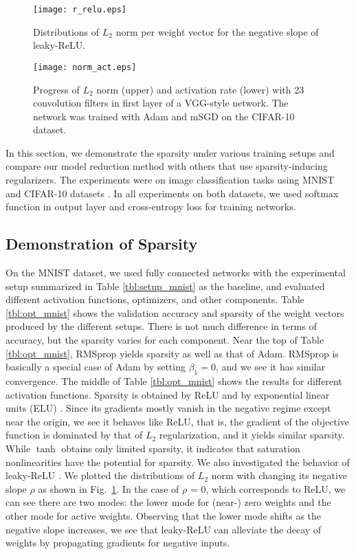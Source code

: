 \documentclass[conference]{IEEEtran}
\begin{document}
\begin{figure}[t]
	\centerline{\texttt{[image: r\_relu.eps]}}
	\caption{Distributions of $L_2$ norm per weight vector for the negative slope of leaky-ReLU.}
	\label{fig:r_relu}
\end{figure}

\begin{figure}[t]
	\centerline{\texttt{[image: norm\_act.eps]}}
	\caption{
		Progress of $L_2$ norm (upper) and activation rate (lower) with 23 convolution filters in first layer of a VGG-style network. 
		The network was trained with Adam and mSGD on the CIFAR-10 dataset.}
	\label{fig:norm_activation}
\end{figure}

In this section, we demonstrate the sparsity under various training setups and compare our model reduction method with others that use sparsity-inducing regularizers. The experiments were on image classification tasks using MNIST \cite{LeCun_1998} and CIFAR-10 datasets \cite{Krizhevsky_2009}. 
In all experiments on both datasets, we used softmax function in output layer and cross-entropy loss for training networks. 

\subsection{Demonstration of Sparsity}\label{subsec:demo_sparse}
On the MNIST dataset, we used fully connected networks with the experimental setup summarized in Table \ref{tbl:setup_mnist} as the baseline, and evaluated different activation functions, optimizers, and other components.
Table \ref{tbl:opt_mnist} shows the validation accuracy and sparsity of the weight vectors produced by the different setups. 
There is not much difference in terms of accuracy, but the sparsity varies for each component.
Near the top of Table \ref{tbl:opt_mnist}, RMSprop yields sparsity as well as that of Adam.
RMSprop is basically a special case of Adam by setting $\beta_1=0$, and we see it has similar convergence. 
The middle of Table \ref{tbl:opt_mnist} shows the results for different activation functions. 
Sparsity is obtained by ReLU and by exponential linear units (ELU) \cite{Clevert_2016}.
Since its gradients mostly vanish in the negative regime except near the origin, we see it behaves like ReLU, that is, the gradient of the objective function is dominated by that of $L_2$ regularization, and it yields similar sparsity. 
While $\tanh$ obtains only limited sparsity, it indicates that saturation nonlinearities have the potential for sparsity. 
We also investigated the behavior of leaky-ReLU \cite{Maas_2013}. 
We plotted the distributions of $L_2$ norm with changing its negative slope $\rho$ as shown in Fig.~\ref{fig:r_relu}. 
In the case of $\rho$ = 0, which corresponds to ReLU, we can see there are two modes: the lower mode for (near-) zero weights and the other mode for active weights.
Observing that the lower mode shifts as the negative slope increases, we see that leaky-ReLU can alleviate the decay of weights by propagating gradients for negative inputs. 
\end{document}
